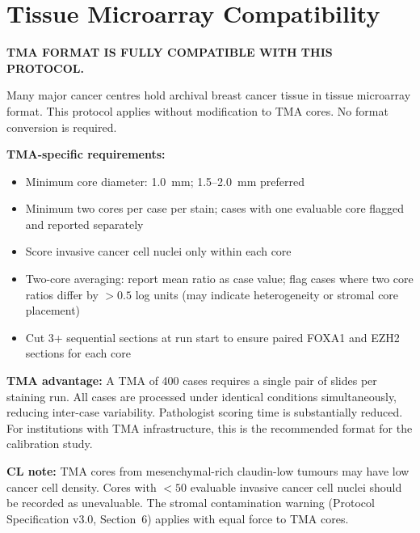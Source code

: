 \documentclass[11pt, a4paper]{article}
\begin{document}
\section{Tissue Microarray Compatibility}

\begin{mdframed}[backgroundcolor=tmabox,
                 linecolor=blue!50!black,
                 linewidth=1pt]
\textbf{TMA FORMAT IS FULLY COMPATIBLE WITH
THIS PROTOCOL.}

Many major cancer centres hold archival breast
cancer tissue in tissue microarray format.
This protocol applies without modification to
TMA cores. No format conversion is required.

\textbf{TMA-specific requirements:}
\begin{itemize}[noitemsep]
    \item Minimum core diameter: 1.0~mm;
    1.5--2.0~mm preferred
    \item Minimum two cores per case per
    stain; cases with one evaluable core
    flagged and reported separately
    \item Score invasive cancer cell nuclei
    only within each core
    \item Two-core averaging: report mean
    ratio as case value; flag cases where
    two core ratios differ by $>0.5$ log
    units (may indicate heterogeneity or
    stromal core placement)
    \item Cut 3+ sequential sections at
    run start to ensure paired FOXA1 and
    EZH2 sections for each core
\end{itemize}

\textbf{TMA advantage:} A TMA of 400 cases
requires a single pair of slides per
staining run. All cases are processed
under identical conditions simultaneously,
reducing inter-case variability. Pathologist
scoring time is substantially reduced.
For institutions with TMA infrastructure,
this is the recommended format for the
calibration study.

\textbf{CL note:} TMA cores from
mesenchymal-rich claudin-low tumours may
have low cancer cell density. Cores with
$<50$ evaluable invasive cancer cell
nuclei should be recorded as unevaluable.
The stromal contamination warning (Protocol
Specification v3.0, Section~6) applies
with equal force to TMA cores.
\end{mdframed}
\end{document}
